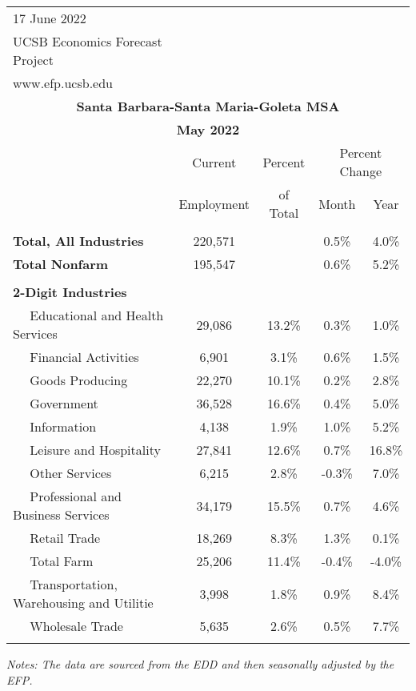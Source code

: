 \documentclass[12pt]{article}
\begin{document}
\begin{landscape}
\begin{table}
\begin{tabular}{|l|c|c|c|c|}
\multicolumn{1}{l}{\small 17 June 2022} & \multicolumn{4}{c}{} \\
\multicolumn{1}{l}{\small UCSB Economics Forecast Project} & \multicolumn{4}{c}{} \\
\multicolumn{1}{l}{\small www.efp.ucsb.edu} & \multicolumn{4}{c}{} \\
\multicolumn{5}{c}{\large \textbf{Santa Barbara-Santa Maria-Goleta MSA}} \\
\multicolumn{5}{c}{\large \textbf{May 2022}} \
\multicolumn{5}{l}{\small Data Seasonally Adjusted} \\ \hline \hline
& Current & Percent & \multicolumn{2}{c}{Percent Change} \vline \\
& Employment & of Total & Month & Year \\ \hline
&&&& \\
\textbf{Total, All Industries} & 220,571 && 0.5\% & 4.0\% \\
\textbf{Total Nonfarm} & 195,547 && 0.6\% & 5.2\% \\
&&&& \\
\textbf{2-Digit Industries} &&&& \\
$\quad$ Educational and Health Services & 29,086 & 13.2\% & 0.3\% & 1.0\% \\
$\quad$ Financial Activities & 6,901 & 3.1\% & 0.6\% & 1.5\% \\
$\quad$ Goods Producing & 22,270 & 10.1\% & 0.2\% & 2.8\% \\
$\quad$ Government & 36,528 & 16.6\% & 0.4\% & 5.0\% \\
$\quad$ Information & 4,138 & 1.9\% & 1.0\% & 5.2\% \\
$\quad$ Leisure and Hospitality & 27,841 & 12.6\% & 0.7\% & 16.8\% \\
$\quad$ Other Services & 6,215 & 2.8\% & -0.3\% & 7.0\% \\
$\quad$ Professional and Business Services & 34,179 & 15.5\% & 0.7\% & 4.6\% \\
$\quad$ Retail Trade & 18,269 & 8.3\% & 1.3\% & 0.1\% \\
$\quad$ Total Farm & 25,206 & 11.4\% & -0.4\% & -4.0\% \\
$\quad$ Transportation, Warehousing and Utilitie & 3,998 & 1.8\% & 0.9\% & 8.4\% \\
$\quad$ Wholesale Trade & 5,635 & 2.6\% & 0.5\% & 7.7\% \\
&&&& \\ \hline \hline
\end{tabular}
\par
\vspace{.5em}
\footnotesize
\textit{Notes: The data are sourced from the EDD and then seasonally adjusted by the EFP.}
\end{table}
\end{landscape}
\end{document}
